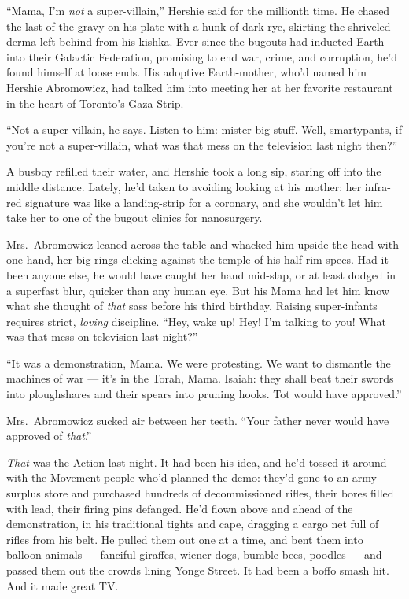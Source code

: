 ``Mama, I'm \emph{not} a super-villain,'' Hershie said for the
millionth time. He chased the last of the gravy on his plate with a
hunk of dark rye, skirting the shriveled derma left behind from his
kishka. Ever since the bugouts had inducted Earth into their
Galactic Federation, promising to end war, crime, and corruption,
he'd found himself at loose ends. His adoptive Earth-mother, who'd
named him Hershie Abromowicz, had talked him into meeting her at
her favorite restaurant in the heart of Toronto's Gaza Strip.

``Not a super-villain, he says. Listen to him: mister big-stuff. Well, 
smartypants, if you're not a super-villain, what was that mess on the 
television last night then?''

A busboy refilled their water, and Hershie took a long sip, staring
off into the middle distance. Lately, he'd taken to avoiding
looking at his mother: her infra-red signature was like a
landing-strip for a coronary, and she wouldn't let him take her to
one of the bugout clinics for nanosurgery.

Mrs.~Abromowicz leaned across the table and whacked him upside the
head with one hand, her big rings clicking against the temple of
his half-rim specs. Had it been anyone else, he would have caught
her hand mid-slap, or at least dodged in a superfast blur, quicker
than any human eye. But his Mama had let him know what she thought
of \emph{that} sass before his third birthday. Raising
super-infants requires strict, \emph{loving} discipline.
``Hey, wake up! Hey! I'm talking to you! What was that mess on television last 
night?''

``It was a demonstration, Mama. We were protesting. We want to dismantle the 
machines of war --- it's in the Torah, Mama. Isaiah: they shall beat their 
swords into ploughshares and their spears into pruning hooks. Tot would have 
approved.''

Mrs.~Abromowicz sucked air between her teeth.
``Your father never would have approved of \emph{that}.''

\emph{That} was the Action last night. It had been his idea, and
he'd tossed it around with the Movement people who'd planned the
demo: they'd gone to an army-surplus store and purchased hundreds
of decommissioned rifles, their bores filled with lead, their
firing pins defanged. He'd flown above and ahead of the
demonstration, in his traditional tights and cape, dragging a cargo
net full of rifles from his belt. He pulled them out one at a time,
and bent them into balloon-animals --- fanciful giraffes,
wiener-dogs, bumble-bees, poodles --- and passed them out the
crowds lining Yonge Street. It had been a boffo smash hit. And it
made great TV.

